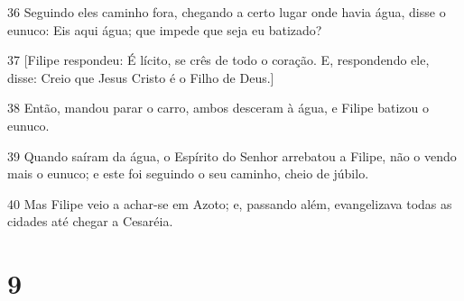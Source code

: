 \par 36 Seguindo eles caminho fora, chegando a certo lugar onde havia água, disse o eunuco: Eis aqui água; que impede que seja eu batizado?
\par 37 [Filipe respondeu: É lícito, se crês de todo o coração. E, respondendo ele, disse: Creio que Jesus Cristo é o Filho de Deus.]
\par 38 Então, mandou parar o carro, ambos desceram à água, e Filipe batizou o eunuco.
\par 39 Quando saíram da água, o Espírito do Senhor arrebatou a Filipe, não o vendo mais o eunuco; e este foi seguindo o seu caminho, cheio de júbilo.
\par 40 Mas Filipe veio a achar-se em Azoto; e, passando além, evangelizava todas as cidades até chegar a Cesaréia.

\chapter{9}


